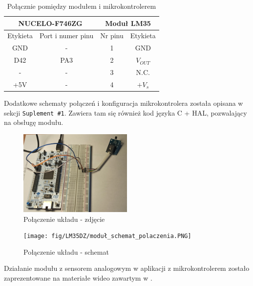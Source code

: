 \documentclass[11pt, a4paper]{article}
\begin{document}
\vspace{0.5cm}
\begin{table}[h!]
    \centering
    \begin{tabular}{|c|c|c|c|} 
        \hline
        \multicolumn{2}{|c|}{NUCELO-F746ZG} & \multicolumn{2}{c|}{Moduł LM35}  \\ 
        \hline
        Etykieta & Port i numer pinu       & Nr pinu & Etykieta           \\ 
        \hline
        GND      & -                    & 1       & GND             
        \\
        \hline
        D42      & PA3                    & 2       & $V_{OUT}$          
        \\
        \hline
        -      & -                      & 3       & N.C.              \\
        \hline
        +5V      & -                       & 4       & $+V_s$              \\
        \hline
    \end{tabular}
    \caption{Połącznie pomiędzy modułem i mikrokontrolerem}
    \label{tab:tab1}
\end{table}

Dodatkowe schematy połączeń i konfiguracja
mikrokontrolera została opisana w sekcji \texttt{Suplement \#1}. Zawiera tam się również kod języka
C + HAL, pozwalający na obsługę modułu.

\newpage
\begin{figure}[h]
    \centering
    \includegraphics[width=0.5\textwidth]{fig/LM35DZ/polaczenie.jpg}
    \caption{Połączenie układu - zdjęcie}
    \label{fig:polaczenie_ukladu}
\end{figure}
\begin{figure}[h]
    \centering
    \texttt{[image: fig/LM35DZ/moduł\_schemat\_polaczenia.PNG]}
    \caption{Połączenie układu - schemat}
    \label{fig:polaczenie_ukladu}
\end{figure}
\vspace{0.5cm}
Działanie modułu z sensorem analogowym w aplikacji z mikrokontrolerem zostało zaprezentowane na materiałe wideo zawartym w \texttt{\cite{yt1}}.

\newpage
\printbibliography[heading=bibintoc]
\end{document}
